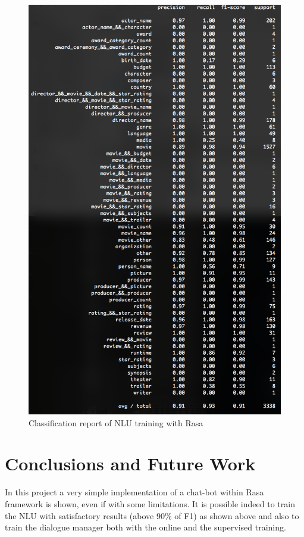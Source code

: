 \documentclass[11pt,a4paper]{article}
\begin{document}
\begin{figure}[h]
	\center\includegraphics[scale=.5]{images/results}
	\center\caption{Classification report of NLU training with Rasa}
\end{figure}

\section{Conclusions and Future Work}

In this project a very simple implementation of a chat-bot within Rasa framework is shown, even if with some limitations. It is possible indeed to train the NLU with satisfactory results (above $90\%$ of F1) as shown above and also to train the dialogue manager both with the online and the supervised training.\\
\end{document}
